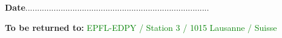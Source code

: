 \documentclass[11pt,titlepage]{article}
\begin{document}
\noindent \textbf{Date}\hspace{8.05cm}..............................................................................\\

\vspace{0.8cm}
\begin{center}
\end{center}
\begin{center}
\textbf{To be returned to:} \textcolor{green}{EPFL-EDPY / Station 3 / 1015 Lausanne / Suisse}
\end{center}
\end{document}
